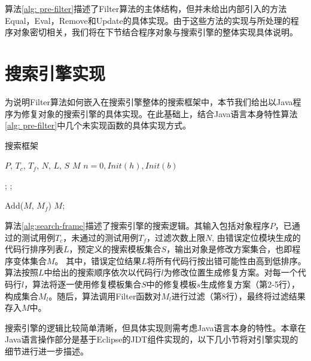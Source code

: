 算法\ref{alg: pre-filter}描述了Filter算法的主体结构，但并未给出内部引入的方法Equal，Eval，Remove和Update的具体实现。由于这些方法的实现与所处理的程序对象密切相关，我们将在下节结合程序对象与搜索引擎的整体实现具体说明。

\section{搜索引擎实现}

为说明Filter算法如何嵌入在搜索引擎整体的搜索框架中，本节我们给出以Java程序为修复对象的搜索引擎的具体实现。在此基础上，结合Java语言本身特性算法\ref{alg: pre-filter}中几个未实现函数的具体实现方式。

\begin{algorithm}
	\caption{搜索框架}
	\label{alg:search-frame}
	\begin{algorithmic}[1]
		\renewcommand{\algorithmicrequire}{\textbf{Input:}}
		\renewcommand\algorithmicensure {\textbf{Output:} }
		\REQUIRE $P$, $T_c$, $T_f$, $N$, $L$, $S$
		\ENSURE $M$
			\ENDFOR
			\STATE $n = 0, Init(h), Init(b)$
			
				;
				;

			\STATE Add($M$, $M_f$)
		\ENDFOR
		\RETURN $M$;
		
	\end{algorithmic}
\end{algorithm}


算法\ref{alg:search-frame}描述了搜索引擎的搜索逻辑。其输入包括对象程序$P$，已通过的测试用例$T_c$，未通过的测试用例$T_f$，过滤次数上限$N$, 由错误定位模块生成的代码行排序列表$L$，预定义的搜索模板集合$S$，输出对象是修改方案集合，也即程序变体集合$M$。
其中，错误定位结果$L$将所有代码行按出错可能性由高到低排序。算法按照$L$中给出的搜索顺序依次以代码行$l$为修改位置生成修复方案。对每一个代码行$l$，算法将逐一使用修复模板集合$S$中的修复模板$s$生成修复方案（第2-5行），构成集合$M_l$。随后，算法调用Filter函数对$M_l$进行过滤（第8行），最终将过滤结果存入$M$中。

搜索引擎的逻辑比较简单清晰，但具体实现则需考虑Java语言本身的特性。本章在Java语言操作部分是基于Eclipse的JDT组件\cite{eclipse:jdt}实现的，以下几小节将对引擎实现的细节进行进一步描述。

